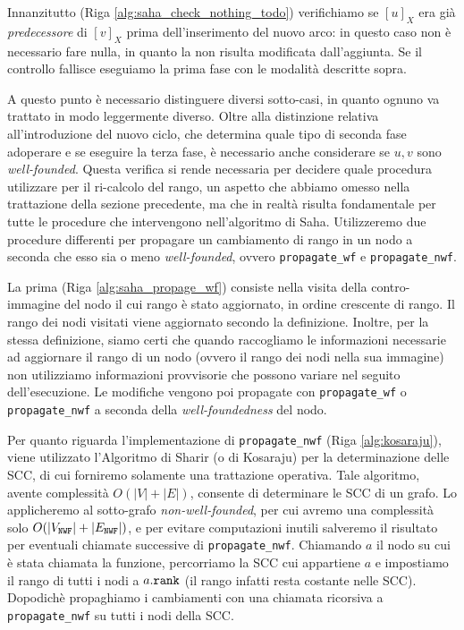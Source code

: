 Innanzitutto (Riga \ref{alg:saha_check_nothing_todo}) verifichiamo se $[u]_X$ era già \emph{predecessore} di $[v]_X$ prima dell'inserimento del nuovo arco: in questo caso non è necessario fare nulla, in quanto la \rscp non risulta modificata dall'aggiunta. Se il controllo fallisce eseguiamo la prima fase con le modalità descritte sopra.

A questo punto è necessario distinguere diversi sotto-casi, in quanto ognuno va trattato in modo leggermente diverso. Oltre alla distinzione relativa all'introduzione del nuovo ciclo, che determina quale tipo di seconda fase adoperare e se eseguire la terza fase, è necessario anche considerare se $u,v$ sono \emph{well-founded}. Questa verifica si rende necessaria per decidere quale procedura utilizzare per il ri-calcolo del rango, un aspetto che abbiamo omesso nella trattazione della sezione precedente, ma che in realtà risulta fondamentale per tutte le procedure che intervengono nell'algoritmo di Saha. Utilizzeremo due procedure differenti per propagare un cambiamento di rango in un nodo a seconda che esso sia o meno \emph{well-founded}, ovvero \texttt{propagate\_wf} e \texttt{propagate\_nwf}.

La prima (Riga \ref{alg:saha_propage_wf}) consiste nella visita della contro-immagine del nodo il cui rango è stato aggiornato, in ordine crescente di rango. Il rango dei nodi visitati viene aggiornato secondo la definizione. Inoltre, per la stessa definizione, siamo certi che quando raccogliamo le informazioni necessarie ad aggiornare il rango di un nodo (ovvero il rango dei nodi nella sua immagine) non utilizziamo informazioni provvisorie che possono variare nel seguito dell'esecuzione. Le modifiche vengono poi propagate con \texttt{propagate\_wf} o \texttt{propagate\_nwf} a seconda della \emph{well-foundedness} del nodo.

Per quanto riguarda l'implementazione di \texttt{propagate\_nwf} (Riga \ref{alg:kosaraju}), viene utilizzato l'Algoritmo di Sharir (o di Kosaraju) \cite{sharir} per la determinazione delle SCC, di cui forniremo solamente una trattazione operativa. Tale algoritmo, avente complessità $O(|V| + |E|)$, consente di determinare le SCC di un grafo. Lo applicheremo al sotto-grafo \emph{non-well-founded}, per cui avremo una complessità solo $O(|V_{\texttt{\textup{NWF}}}| + |E_{\texttt{\textup{NWF}}}|)$, e per evitare computazioni inutili salveremo il risultato per eventuali chiamate successive di \texttt{propagate\_nwf}. Chiamando $a$ il nodo su cui è stata chiamata la funzione, percorriamo la SCC cui appartiene $a$ e impostiamo il rango di tutti i nodi a $a.\texttt{\textup{rank}}$ (il rango infatti resta costante nelle SCC). Dopodichè propaghiamo i cambiamenti con una chiamata ricorsiva a \texttt{propagate\_nwf} su tutti i nodi della SCC.

